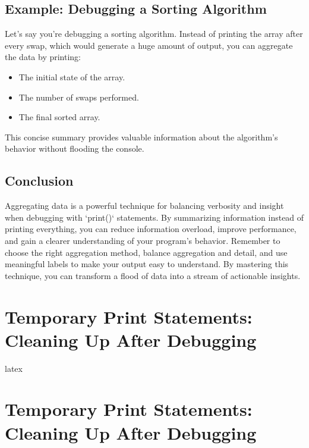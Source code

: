 \documentclass{article}
\begin{document}
{{{\subsection*{Example: Debugging a Sorting Algorithm}

Let's say you're debugging a sorting algorithm. Instead of printing the array after every swap, which would generate a huge amount of output, you can aggregate the data by printing:

\begin{itemize}
\item The initial state of the array.
\item The number of swaps performed.
\item The final sorted array.
\end{itemize}

This concise summary provides valuable information about the algorithm's behavior without flooding the console.

\subsection*{Conclusion}

Aggregating data is a powerful technique for balancing verbosity and insight when debugging with `print()` statements. By summarizing information instead of printing everything, you can reduce information overload, improve performance, and gain a clearer understanding of your program's behavior. Remember to choose the right aggregation method, balance aggregation and detail, and use meaningful labels to make your output easy to understand. By mastering this technique, you can transform a flood of data into a stream of actionable insights.

\newpage

\section*{Temporary Print Statements: Cleaning Up After Debugging} %
\label{chapter-4-6-Temporary_Print_Statements__Cleaning_Up}

latex
\section*{Temporary Print Statements: Cleaning Up After Debugging}

}}}
\end{document}
